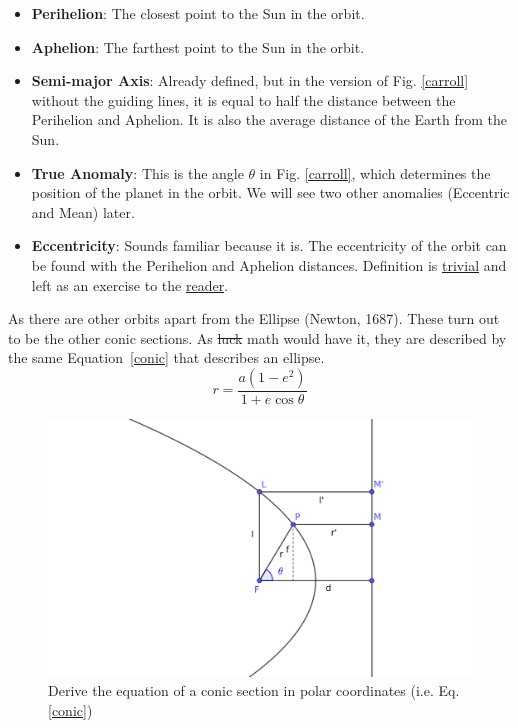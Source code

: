 \documentclass[12pt]{article}
\begin{document}
	\begin{itemize}
		\setlength{\parskip}{0pt}
		\setlength{\itemsep}{0pt}
		\item \textbf{Perihelion}: The closest point to the Sun in the orbit.
		\item \textbf{Aphelion}: The farthest point to the Sun in the orbit.
		\item \textbf{Semi-major Axis}: Already defined, but in the version of Fig. \ref{carroll} without the guiding lines, it is equal to half the distance between the Perihelion and Aphelion. It is also the average distance of the Earth from the Sun. 
		\item \textbf{True Anomaly}: This is the angle $\theta$ in Fig. \ref{carroll}, which determines the position of the planet in the orbit. We will see two other anomalies (Eccentric and Mean) later.
		\item \textbf{Eccentricity}: Sounds familiar because it is. The eccentricity of the orbit can be found with the Perihelion and Aphelion distances. Definition is \href{http://staffhome.ecm.uwa.edu.au/~00043886/humour/invalid.proofs.html#1.2Proofbyintimidation}{trivial} and left as an exercise to the \href{http://staffhome.ecm.uwa.edu.au/~00043886/humour/invalid.proofs.html#1.6Proofbyomission}{reader}.
	\end{itemize}
	As there are other orbits apart from the Ellipse (Newton, 1687). These turn out to be the other conic sections. As \st{luck} math would have it, they are described by the same Equation~\ref{conic} that describes an ellipse.
	\begin{equation*}
		r = \frac{a(1-e^2)}{1 + e\cos \theta}
	\end{equation*}
	\begin{figure}[!h]
		\centering
		\includegraphics{conicderivation.png}
		\caption{Derive the equation of a conic section in polar coordinates (i.e. Eq. \ref{conic})}
		\label{conic_derivation}
	\end{figure}
\end{document}
